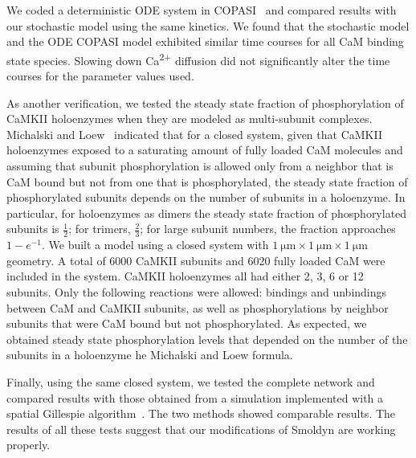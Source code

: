 \documentclass[10pt,letterpaper]{article}
\begin{document}
We coded a deterministic ODE system in COPASI~\cite{Hoops:2006gy} and compared results with our stochastic model using the same kinetics. We found that the stochastic model and the ODE COPASI model exhibited similar time courses for all CaM binding state species. Slowing down Ca\textsuperscript{2+} diffusion did not significantly alter the time courses for the parameter values used. 
%	 

As another verification, we tested the steady state fraction of phosphorylation of CaMKII holoenzymes when they are modeled as multi-subunit complexes. Michalski and Loew~\cite{Michalski:2012ds} indicated that for a closed system, given that CaMKII holoenzymes exposed to a saturating amount of fully loaded CaM molecules and assuming that subunit phosphorylation is allowed only from a neighbor that is CaM bound but not from one that is phosphorylated, the steady state fraction of phosphorylated subunits depends on the number of subunits in a holoenzyme. In particular, for holoenzymes as dimers the steady state fraction of phosphorylated subunits is $\frac{1}{2}$; for trimers, $\frac{2}{3}$; for large subunit numbers, the fraction approaches $1-e^{-1}$. We built a model using a closed system with $\SI{1}{\um}\times\SI{1}{\um}\times\SI{1}{\um}$ geometry. A total of 6000 CaMKII subunits and 6020 fully loaded CaM were included in the system. CaMKII holoenzymes all had either 2, 3, 6 or 12 subunits. Only the following reactions were allowed: bindings and unbindings between CaM and CaMKII subunits, as well as phosphorylations by neighbor subunits that were CaM bound but not phosphorylated. As expected, we obtained steady state phosphorylation levels that depended on the number of the subunits in a holoenzyme 
he Michalski and Loew formula.

Finally, using the same closed system, we tested the complete network and compared results with those obtained from a simulation implemented with a spatial Gillespie algorithm~\cite{Zeng:2010bq}. The two methods showed comparable results. The results of all these tests suggest that our modifications of Smoldyn are working properly. 
\end{document}
